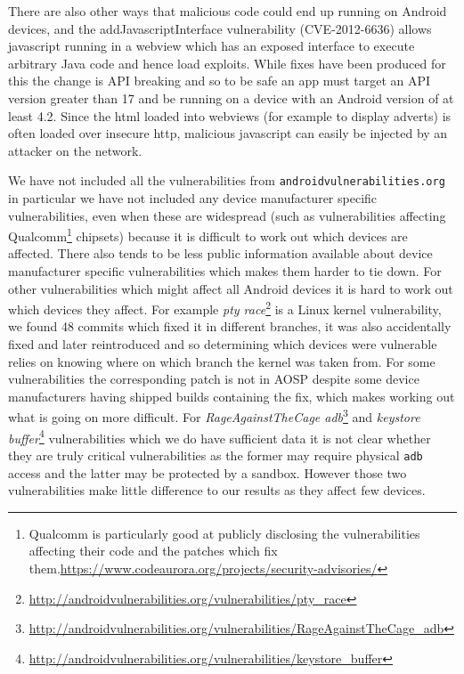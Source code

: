 \documentclass[conference,a4paper,twoside]{IEEEtran}
\newcommand{\avo}{\texttt{androidvulnerabilities.org}}
\begin{document}
There are also other ways that malicious code could end up running on Android devices, and the addJavascriptInterface vulnerability (CVE-2012-6636) allows javascript running in a webview which has an exposed interface to execute arbitrary Java code and hence load exploits.
While fixes have been produced for this the change is API breaking and so to be safe an app must target an API version greater than 17 and be running on a device with an Android version of at least 4.2.
Since the html loaded into webviews (for example to display adverts) is often loaded over insecure http, malicious javascript can easily be injected by an attacker on the network.

We have not included all the vulnerabilities from \avo\, in particular we have not included any device manufacturer specific vulnerabilities, even when these are widespread (such as vulnerabilities affecting Qualcomm\footnote{Qualcomm is particularly good at publicly disclosing the vulnerabilities affecting their code and the patches which fix them.\url{https://www.codeaurora.org/projects/security-advisories/}} chipsets) because it is difficult to work out which devices are affected.
There also tends to be less public information available about device manufacturer specific vulnerabilities which makes them harder to tie down.
For other vulnerabilities which might affect all Android devices it is hard to work out which devices they affect.
For example \emph{pty race}\footnote{\url{http://androidvulnerabilities.org/vulnerabilities/pty_race}} is a Linux kernel vulnerability, we found 48 commits which fixed it in different branches, it was also accidentally fixed and later reintroduced and so determining which devices were vulnerable relies on knowing where on which branch the kernel was taken from.
For some vulnerabilities the corresponding patch is not in AOSP despite some device manufacturers having shipped builds containing the fix, which makes working out what is going on more difficult.
For \emph{RageAgainstTheCage adb}\footnote{\url{http://androidvulnerabilities.org/vulnerabilities/RageAgainstTheCage_adb}} and \emph{keystore buffer}\footnote{\url{http://androidvulnerabilities.org/vulnerabilities/keystore_buffer}} vulnerabilities which we do have sufficient data it is not clear whether they are truly critical vulnerabilities as the former may require physical \texttt{adb} access and the latter may be protected by a sandbox.
However those two vulnerabilities make little difference to our results as they affect few devices.
\end{document}
